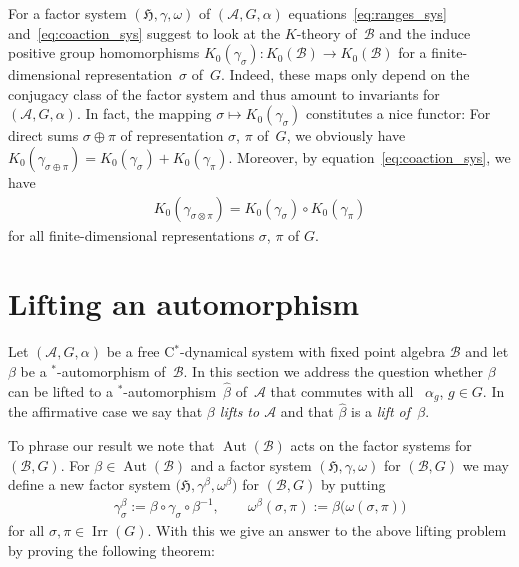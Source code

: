 \documentclass[10pt,a4paper]{amsart}
\numberwithin{equation}{section}
\newcommand*{\tensor}{\otimes}		%
\DeclareMathOperator{\Aut}{Aut}
\newcommand*{\Star}{$^*$\nobreakdash}
\newcommand*{\hilb}{\mathfrak}		%
\newcommand*{\alg}{\mathcal}		%
\newcommand*{\hH}{\hilb{H}}			%
\newcommand*{\aA}{\alg{A}}			%
\newcommand*{\aB}{\alg{B}} 			%
\DeclareMathOperator{\Irrep}{Irr} 			%
\begin{document}
\begin{Remark}\label{rem:K0_factor_sys}
For a factor system $(\hH, \gamma, \omega)$ of $(\aA,G,\alpha)$ equations~\eqref{eq:ranges_sys} and~\eqref{eq:coaction_sys} suggest to look at the $K$-theory of~$\aB$ and the induce positive group homomorphisms $K_0(\gamma_\sigma)\colon K_0(\aB) \to K_0(\aB)$ for a finite-dimensional representation~$\sigma$ of~$G$.
	Indeed, these maps only depend on the conjugacy class of the factor system and thus amount to invariants for $(\aA, G, \alpha)$.
	In fact, the mapping $\sigma \mapsto K_0(\gamma_\sigma)$ constitutes a nice functor:
	For direct sums $\sigma \oplus \pi$ of representation $\sigma$, $\pi$ of~$G$, we obviously have $K_0(\gamma_{\sigma \oplus \pi}) = K_0(\gamma_\sigma) + K_0(\gamma_\pi)$. Moreover, by equation~\eqref{eq:coaction_sys}, we have
	\begin{gather*}
		K_0(\gamma_{\sigma \tensor \pi}) = K_0(\gamma_\sigma) \circ K_0(\gamma_\pi)
	\end{gather*}
	for all finite-dimensional representations $\sigma$, $\pi$ of $G$.
\end{Remark}

\section{Lifting an automorphism}\label{sec:lift_automorphism}

Let $(\aA, G, \alpha)$ be a free C\Star-dynamical system with fixed point algebra $\aB$ and let $\beta$ be a \Star-auto\-mor\-phism of~$\aB$.
In this section we address the question whether $\beta$ can be lifted to a \Star-automorphism~$\hat \beta$ of~$\aA$ that commutes with all~ $\alpha_g$, $g \in G$.
In the affirmative case we say that \emph{$\beta$ lifts to $\aA$} and that $\hat \beta$ is a \emph{lift of~$\beta$}.

To phrase our result we note that $\Aut(\aB)$ acts on the factor systems for $(\aB,G)$.
For $\beta \in \Aut(\aB)$ and a factor system $(\hH, \gamma, \omega)$ for $(\aB,G)$ we may define a new factor system $\big(\hH, \gamma^\beta, \omega^\beta\big)$ for $(\aB,G)$ by putting
\begin{gather*}
	\gamma^\beta_\sigma
	:= \beta \circ \gamma_\sigma \circ \beta^{-1},
	\qquad
	\omega^\beta(\sigma, \pi)
	:= \beta \bigl( \omega(\sigma, \pi) \bigr)%
\end{gather*}
for all $\sigma, \pi \in \Irrep(G)$.
With this we give an answer to the above lifting problem by proving the following theorem:
\end{document}
